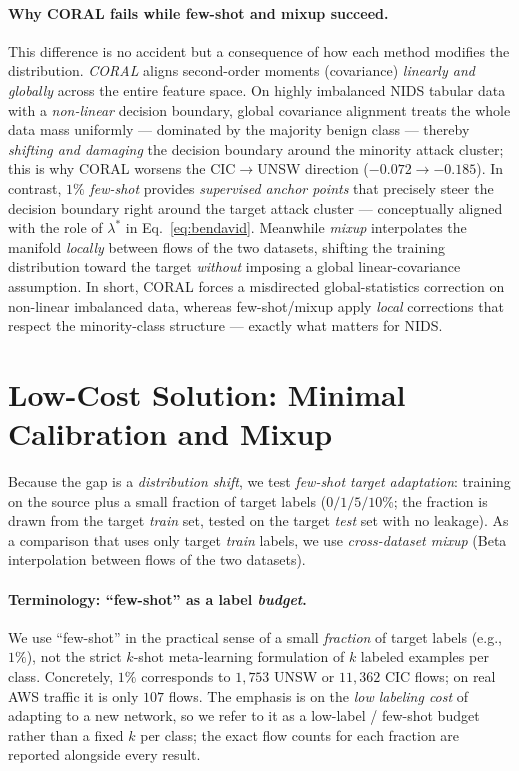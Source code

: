 \documentclass[preprint,12pt,authoryear]{elsarticle}
\begin{document}
\paragraph{Why CORAL fails while few-shot and mixup succeed.} This difference is
no accident but a consequence of how each method modifies the distribution.
\emph{CORAL} aligns second-order moments (covariance) \emph{linearly and globally}
across the entire feature space. On highly imbalanced NIDS tabular data with a
\emph{non-linear} decision boundary, global covariance alignment treats the whole
data mass uniformly --- dominated by the majority benign class --- thereby
\emph{shifting and damaging} the decision boundary around the minority attack
cluster; this is why CORAL worsens the CIC$\rightarrow$UNSW direction ($-0.072
\rightarrow -0.185$). In contrast, $1\%$ \emph{few-shot} provides \emph{supervised
anchor points} that precisely steer the decision boundary right around the target
attack cluster --- conceptually aligned with the role of $\lambda^\ast$ in
Eq.~\eqref{eq:bendavid}. Meanwhile \emph{mixup} interpolates the manifold
\emph{locally} between flows of the two datasets, shifting the training
distribution toward the target \emph{without} imposing a global linear-covariance
assumption. In short, CORAL forces a misdirected global-statistics correction on
non-linear imbalanced data, whereas few-shot/mixup apply \emph{local} corrections
that respect the minority-class structure --- exactly what matters for NIDS.

\section{Low-Cost Solution: Minimal Calibration and Mixup}
\label{sec:da}

Because the gap is a \emph{distribution shift}, we test \emph{few-shot target
adaptation}: training on the source plus a small fraction of target labels
($0/1/5/10\%$; the fraction is drawn from the target \emph{train} set, tested on
the target \emph{test} set with no leakage). As a comparison that uses only target
\emph{train} labels, we use \emph{cross-dataset mixup} (Beta interpolation between
flows of the two datasets).

\paragraph{Terminology: ``few-shot'' as a label \emph{budget}.} We use ``few-shot''
in the practical sense of a small \emph{fraction} of target labels (e.g., $1\%$),
not the strict $k$-shot meta-learning formulation of $k$ labeled examples per class.
Concretely, $1\%$ corresponds to $1{,}753$ UNSW or $11{,}362$ CIC flows; on real
AWS traffic it is only $107$ flows. The emphasis is on the \emph{low labeling cost}
of adapting to a new network, so we refer to it as a low-label / few-shot budget
rather than a fixed $k$ per class; the exact flow counts for each fraction are
reported alongside every result.
\end{document}

